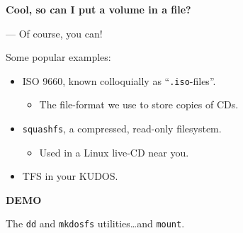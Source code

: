\begin{frame}

\begin{center}

\Large \textbf{Cool, so can I put a volume in a file?}

\end{center}

\pause

\begin{flushright}

--- Of course, you can!

\end{flushright}

Some popular examples:

\begin{itemize}

\item ISO 9660, known colloquially as ``\texttt{.iso}-files''.

\begin{itemize}

\item The file-format we use to store copies of CDs.

\end{itemize}

\item \texttt{squashfs}, a compressed, read-only filesystem.

\begin{itemize}

\item Used in a Linux live-CD near you.

\end{itemize}

\item TFS in your KUDOS.

\end{itemize}

\end{frame}


\begin{frame}

\begin{center}

\Huge \textbf{DEMO}

\bigskip

\large The \texttt{dd} and \texttt{mkdosfs} utilities\ldots and \texttt{mount}.

\end{center}


\end{frame}


